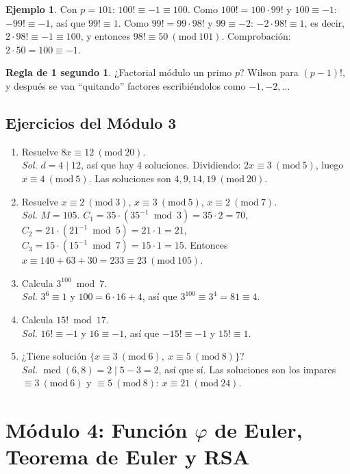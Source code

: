 \documentclass[11pt,a4paper]{article}
\theoremstyle{definition}
\newtheorem{ejemplo}[teorema]{Ejemplo}
\newcommand{\md}[1]{\ (\mathrm{mod}\ #1)}
\newcommand{\mcd}{\operatorname{mcd}}
\theoremstyle{notait}
\theoremstyle{nota}
\newtheorem*{regla}{Regla de 1 segundo}
\begin{document}
\begin{ejemplo}
Con $p=101$: $100!\equiv-1\equiv100$. Como $100!=100\cdot99!$ y $100\equiv-1$: $-99!\equiv-1$, así que $99!\equiv1$. Como $99!=99\cdot98!$ y $99\equiv-2$: $-2\cdot98!\equiv1$, es decir, $2\cdot98!\equiv-1\equiv100$, y entonces $98!\equiv50\md{101}$. Comprobación: $2\cdot50=100\equiv-1$.
\end{ejemplo}

\begin{regla}
¿Factorial módulo un primo $p$? Wilson para $(p-1)!$, y después se van ``quitando'' factores escribiéndolos como $-1,-2,\dots$
\end{regla}

\subsection*{Ejercicios del Módulo 3}
\begin{enumerate}[label=\textbf{3.\arabic*}]
\item Resuelve $8x\equiv12\md{20}$.\\
\emph{Sol.} $d=4\mid12$, así que hay 4 soluciones. Dividiendo: $2x\equiv3\md5$, luego $x\equiv4\md5$. Las soluciones son $4,9,14,19\md{20}$.
\item Resuelve $x\equiv2\md3$, $x\equiv3\md5$, $x\equiv2\md7$.\\
\emph{Sol.} $M=105$. $C_1=35\cdot(35^{-1}\bmod3)=35\cdot2=70$, $C_2=21\cdot(21^{-1}\bmod5)=21\cdot1=21$, $C_3=15\cdot(15^{-1}\bmod7)=15\cdot1=15$. Entonces $x\equiv140+63+30=233\equiv23\md{105}$.
\item Calcula $3^{100}\bmod7$.\\
\emph{Sol.} $3^6\equiv1$ y $100=6\cdot16+4$, así que $3^{100}\equiv3^4=81\equiv4$.
\item Calcula $15!\bmod17$.\\
\emph{Sol.} $16!\equiv-1$ y $16\equiv-1$, así que $-15!\equiv-1$ y $15!\equiv1$.
\item ¿Tiene solución $\{x\equiv3\md6,\ x\equiv5\md{8}\}$?\\
\emph{Sol.} $\mcd(6,8)=2\mid5-3=2$, así que sí. Las soluciones son los impares $\equiv3\md6$ y $\equiv5\md 8$: $x\equiv21\md{24}$.
\end{enumerate}

\newpage
\section{Módulo 4: Función $\varphi$ de Euler, Teorema de Euler y RSA}
\end{document}
